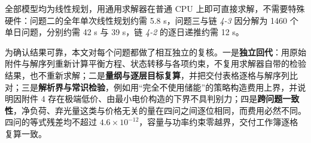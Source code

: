 全部模型均为线性规划，用通用求解器在普通 CPU 上即可直接求解，不需要特殊硬件：问题二的全年单次线性规划约需 5.8 s，问题三与链 \emph{4-3} 因分解为 1460 个单日问题，分别约需 42 s 与 39 s，链 \emph{4-2} 的逐日递推约需 12 s。

为确认结果可靠，本文对每个问题都做了相互独立的复核。一是\textbf{独立回代}：用原始附件与解序列重新计算平衡方程、状态转移与各项约束，不复用求解器自带的检验结果，也不重新求解；二是\textbf{量纲与逐层目标复算}，并把交付表格逐格与解序列比对；三是\textbf{解析界与常识检验}，例如用“完全不使用储能”的策略构造费用上界，并说明因附件 4 存在极端低价、由最小电价构造的下界不具判别力；四是\textbf{跨问题一致性}，净负荷、弃光量这类与价格无关的量在四问之间逐位相同，而费用必然不同。四问的等式残差均不超过 $4.6\times10^{-12}$，容量与功率约束零越界，交付工作簿逐格复算一致。
